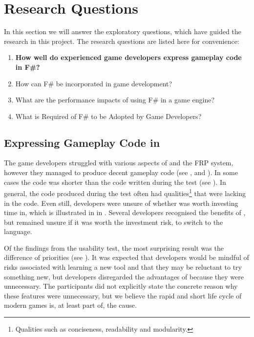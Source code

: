 \section{Research Questions}
In this section we will answer the exploratory questions, which have guided the research in this project. The research questions are listed here for convenience:
\begin{center}
    \begin{enumerate}
        \item \textbf{How well do experienced game developers express gameplay code in F\#?}
        \item How can F\# be incorporated in game development?
        \item What are the performance impacts of using F\# in a game engine?
        \item What is Required of F\# to be Adopted by Game Developers?
    \end{enumerate}
\end{center}

\subsection{Expressing Gameplay Code in \fs}
The game developers struggled with various aspects of \fs and the \gls{FRP} system, however they managed to produce decent gameplay code (see ,  and ). In some cases the \fs code was shorter than the \cs code written during the test (see ). In general, the \fs code produced during the test often had qualities\footnote{Qualities such as conciseness, readability and modularity.} that were lacking in the \cs code. Even still, developers were unsure of whether \fs was worth investing time in, which is illustrated in in . Several developers recognised the benefits of \fs, but remained unsure if it was worth the investment risk, to switch to the language.

Of the findings from the usability test, the most surprising result was the difference of priorities (see ). It was expected that developers would be mindful of risks associated with learning a new tool and that they may be reluctant to try something new, but developers disregarded the advantages of \fs because they were unnecessary. The participants did not explicitly state the concrete reason why these features were unnecessary, but we believe the rapid and short life cycle of modern games is, at least part of, the cause.

